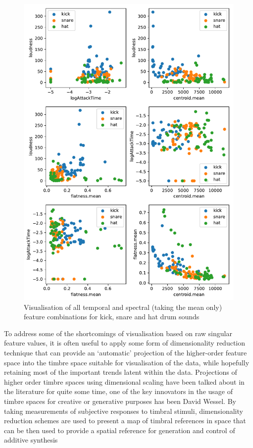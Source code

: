 \begin{figure}
	\begin{center}
		\includegraphics[width=1.0\textwidth]{ch06_rhythmcat/figures/feature_axis_combos.pdf}
	\end{center}
	\caption[Visualisation of all temporal and spectral feature combinations for kick, snare and hat drum sounds]{Visualisation of all temporal and spectral (taking the mean only) feature combinations for kick, snare and hat drum sounds}
	\label{fig:temporal_and_spectral_features}
\end{figure}


To address some of the shortcomings of visualisation based on raw singular feature values, it is often useful to apply some form of dimensionality reduction technique that can provide an `automatic' projection of the higher-order feature space into the timbre space suitable for visualisation of the data, while hopefully retaining most of the important trends latent within the data. Projections of higher order timbre spaces using dimensional scaling have been talked about in the literature for quite some time,  one of the key innovators in the usage of timbre spaces for creative or generative purposes has been David Wessel. By taking measurements of subjective responses to timbral stimuli, dimensionality reduction schemes are used to present a map of timbral references in space that can be then used to provide a spatial reference for generation and control of additive synthesis \citep{Wessel1979, Wessel1976}

